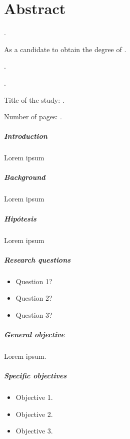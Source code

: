 
\chapter{Abstract}

{\renewcommand{\baselinestretch}{1.1}\selectfont
{\setlength{\leftskip}{10mm}
\setlength{\parindent}{-10mm}

\autor.

As a candidate to obtain the degree of \gradoEng\orientacion.

\uanl.

\fime.

Title of the study: \textsc{\tituloEng}.

\noindent Number of pages: \pageref*{lastpage}.}

\paragraph{Introduction}
Lorem ipsum

\paragraph{Background}
Lorem ipsum

\paragraph{Hipótesis}
Lorem ipsum

\paragraph{Research questions}
\begin{itemize}
    \item Question 1?
    \item Question 2?
    \item Question 3?
\end{itemize}

\paragraph{General objective}
Lorem ipsum.

\paragraph{Specific objectives}
\begin{itemize}
    \item Objective 1.
    \item Objective 2.
    \item Objective 3.
\end{itemize}

}
